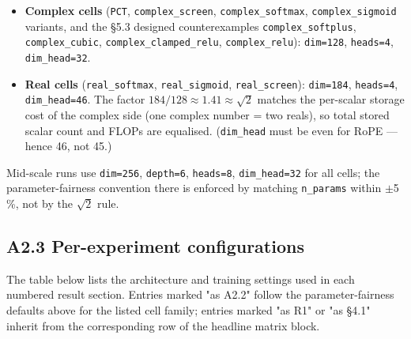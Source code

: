 \documentclass[11pt,a4paper]{article}
\theoremstyle{plain}
\theoremstyle{definition}
\begin{document}
\begin{itemize}
  \item \textbf{Complex cells} (\texttt{PCT}, \texttt{complex\_screen}, \texttt{complex\_softmax}, \texttt{complex\_sigmoid} variants, and the §5.3 designed counterexamples \texttt{complex\_softplus}, \texttt{complex\_cubic}, \texttt{complex\_clamped\_relu}, \texttt{complex\_relu}): \texttt{dim=128}, \texttt{heads=4}, \texttt{dim\_head=32}.
  \item \textbf{Real cells} (\texttt{real\_softmax}, \texttt{real\_sigmoid}, \texttt{real\_screen}): \texttt{dim=184}, \texttt{heads=4}, \texttt{dim\_head=46}. The factor $184 / 128 \approx 1.41 \approx \sqrt{2}$ matches the per-scalar storage cost of the complex side (one complex number = two reals), so total stored scalar count and FLOPs are equalised. (\texttt{dim\_head} must be even for RoPE — hence 46, not 45.)
\end{itemize}

Mid-scale runs use \texttt{dim=256}, \texttt{depth=6}, \texttt{heads=8}, \texttt{dim\_head=32} for all cells; the parameter-fairness convention there is enforced by matching \texttt{n\_params} within $\pm$5\,\%, not by the $\sqrt{2}$ rule.

\subsection*{A2.3 Per-experiment configurations}

The table below lists the architecture and training settings used in each numbered result section. Entries marked "as A2.2" follow the parameter-fairness defaults above for the listed cell family; entries marked "as R1" or "as \S 4.1" inherit from the corresponding row of the headline matrix block.
\end{document}
